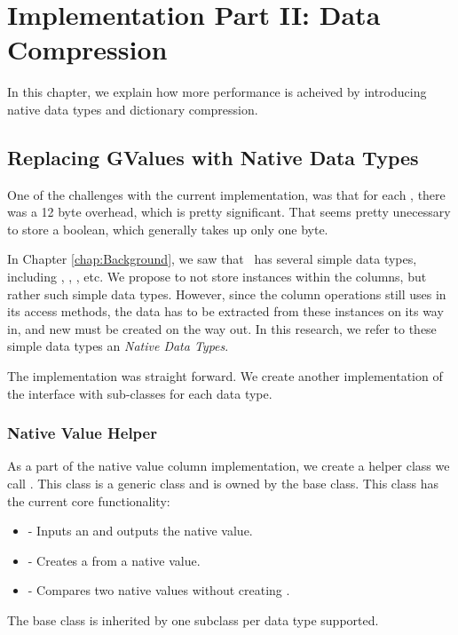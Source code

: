 \chapter{Implementation Part II: Data Compression}
\label{chap:Implementation Part II: Data Compression}
In this chapter, we explain how more performance is acheived by introducing native data types and dictionary compression.

\section{Replacing GValues with Native Data Types}
\label{sec:Replacing GValues with Native Data Types}
One of the challenges with the current implementation, was that for each , there was a 12 byte overhead, which is pretty significant. That seems pretty unecessary to store a boolean, which generally takes up only one byte. 

In Chapter \ref{chap:Background}, we saw that \delphi~has several simple data types, including , , , etc. We propose to not store  instances within the columns, but rather such simple data types. However, since the column operations still uses  in its access methods, the data has to be extracted from these instances on its way in, and new  must be created on the way out. In this research, we refer to these simple data types an \textit{Native Data Types}.

The implementation was straight forward. We create another implementation of the  interface with sub-classes for each data type. 

\subsection{Native Value Helper}
\label{sub:Native Value Helper}
As a part of the native value column implementation, we create a helper class we call . This class is a generic class and is owned by the  base class. This class has the current core functionality:
\begin{itemize}
    \item {} - Inputs an  and outputs the native value.
    \item {} - Creates a  from a native value.
    \item {} - Compares two native values without creating .
\end{itemize}
The base class is inherited by one subclass per data type supported.

